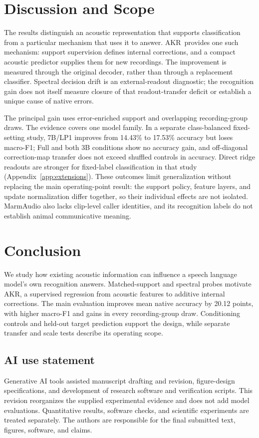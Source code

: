 \documentclass{article}
\newcommand{\method}{AKR}
\begin{document}
\section{Discussion and Scope}
\label{sec:discussion}
The results distinguish an acoustic representation that supports classification from a particular mechanism that uses it to answer. \method\ provides one such mechanism: support supervision defines internal corrections, and a compact acoustic predictor supplies them for new recordings. The improvement is measured through the original decoder, rather than through a replacement classifier. Spectral decision drift is an external-readout diagnostic; the recognition gain does not itself measure closure of that readout-transfer deficit or establish a unique cause of native errors.

The principal gain uses error-enriched support and overlapping recording-group draws. The evidence covers one model family. In a separate class-balanced fixed-setting study, 7B/LP1 improves from 14.43\% to 17.53\% accuracy but loses macro-F1; Full and both 3B conditions show no accuracy gain, and off-diagonal correction-map transfer does not exceed shuffled controls in accuracy. Direct ridge readouts are stronger for fixed-label classification in that study (Appendix~\ref{app:extensions}). These outcomes limit generalization without replacing the main operating-point result: the support policy, feature layers, and update normalization differ together, so their individual effects are not isolated. MarmAudio also lacks clip-level caller identities, and its recognition labels do not establish animal communicative meaning.

\section{Conclusion}
We study how existing acoustic information can influence a speech language model's own recognition answers. Matched-support and spectral probes motivate \method, a supervised regression from acoustic features to additive internal corrections. The main evaluation improves mean native accuracy by 20.12 points, with higher macro-F1 and gains in every recording-group draw. Conditioning controls and held-out target prediction support the design, while separate transfer and scale tests describe its operating scope.
\label{maintextend}

\clearpage
\subsection*{AI use statement}
Generative AI tools assisted manuscript drafting and revision, figure-design specifications, and development of research software and verification scripts. This revision reorganizes the supplied experimental evidence and does not add model evaluations. Quantitative results, software checks, and scientific experiments are treated separately. The authors are responsible for the final submitted text, figures, software, and claims.
\end{document}
